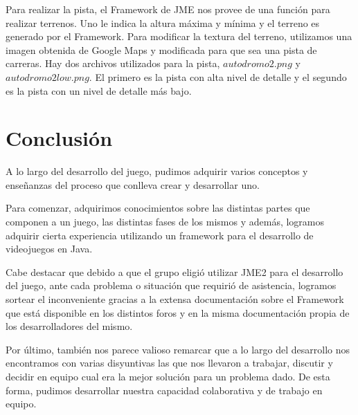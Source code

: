 \documentclass[a4paper,10pt]{article}
\begin{document}
Para realizar la pista, el Framework de JME nos provee de una funci\'on para
realizar terrenos.  Uno le indica la altura m\'axima y m\'inima y el terreno es
generado por el Framework.  Para modificar la textura del terreno, utilizamos
una imagen obtenida de Google Maps y modificada para que sea una pista de
carreras.  Hay dos archivos utilizados para la pista, $autodromo2.png$ y
$autodromo2low.png$.  El primero es la pista con alta nivel de detalle y el
segundo es la pista con un nivel de detalle m\'as bajo.

\section{Conclusi\'on}
\label{conclusiones}

A lo largo del desarrollo del juego, pudimos adquirir varios conceptos y
ense\~nanzas del proceso que conlleva crear y desarrollar uno.

Para comenzar, adquirimos conocimientos sobre las distintas partes que componen
a un juego, las distintas fases de los mismos y adem\'as, logramos adquirir
cierta experiencia utilizando un framework para el desarrollo de videojuegos en
Java.

Cabe destacar que debido a que el grupo eligi\'o utilizar JME2 para el
desarrollo
del juego, ante cada problema o situaci\'on que requiri\'o de asistencia,
logramos
sortear el inconveniente gracias a la extensa documentaci\'on sobre el Framework
que est\'a disponible en los distintos foros y en la misma documentaci\'on
propia
de los desarrolladores del mismo.

Por \'ultimo, tambi\'en nos parece valioso remarcar que a lo largo del
desarrollo nos encontramos con varias disyuntivas las que nos llevaron a
trabajar, discutir y decidir en equipo cual era la mejor soluci\'on para un
problema dado.  De esta forma, pudimos desarrollar nuestra capacidad
colaborativa y de trabajo en equipo.
\end{document}
